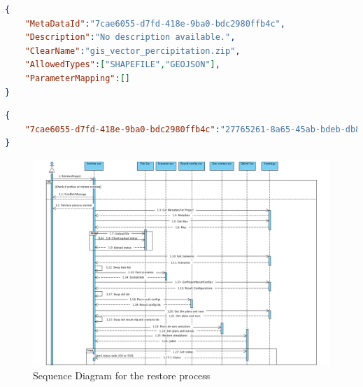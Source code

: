 \begin{lstlisting}[caption={Snippet of the archived MARS scenario resource}, language=json,firstnumber=1, captionpos=b, label={lst:marsScenario}]
{
    "MetaDataId":"7cae6055-d7fd-418e-9ba0-bdc2980ffb4c",
    "Description":"No description available.",
    "ClearName":"gis_vector_percipitation.zip",
    "AllowedTypes":["SHAPEFILE","GEOJSON"],
    "ParameterMapping":[]
}
\end{lstlisting}

\begin{lstlisting}[caption={The mapped key value attributes that the scenario metadata would need}, language=json,firstnumber=1, captionpos=b, label={lst:marsMap}]
{
    "7cae6055-d7fd-418e-9ba0-bdc2980ffb4c":"27765261-8a65-45ab-bdeb-db8b5b7f8f4"
}
    \end{lstlisting}

\begin{figure}[H]
    \centering \includegraphics[scale=0.5, angle=90, origin=c]{grafiken/sequenceRestore.png}
    \caption{Sequence Diagram for the restore process}
    \label{fig:sequenceRestore}
\end{figure}
    
